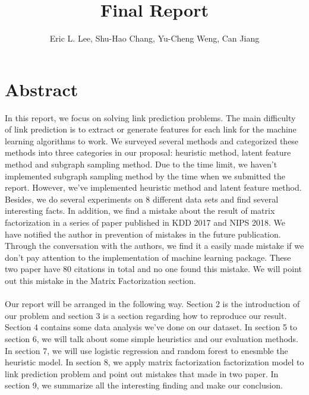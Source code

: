 \documentclass[12pt]{article}
\begin{document}
 
\title{Final Report}
\author{Eric L. Lee, Shu-Hao Chang, Yu-Cheng Weng, Can Jiang} 
\maketitle

\section{Abstract}

In this report, we focus on solving link prediction problems. The main difficulty of link prediction is to extract or generate features for each link for the machine learning algorithms to work. We surveyed several methods and categorized these methods into three categories in our proposal: heuristic method, latent feature method and subgraph sampling method.
Due to the time limit, we haven't implemented subgraph sampling method by the time when we submitted the report. However, we've implemented heuristic method and latent feature method. Besides, we do several experiments on 8 different data sets and find several interesting facts. In addition, we find a mistake about the result of matrix factorization in a series of paper published in KDD 2017 and NIPS 2018. We have notified the author in prevention of mistakes in the future publication. Through the conversation with the authors, we find it a easily made mistake if we don't pay attention to the implementation of machine learning package. These two paper have 80 citations in total and no one found this mistake. We will point out this mistake in the Matrix Factorization section.
\\ \\
Our report will be arranged in the following way. Section 2 is the introduction of our problem and section 3 is a section regarding how to reproduce our result. Section 4 contains some data analysis we've done on our dataset. In section 5 to section 6, we will talk about some simple heuristics and our evaluation methods. In section 7, we will use logistic regression and random forest to enesmble the heuristic model. In section 8, we apply matrix factorization factorization model to link prediction problem and point out mistakes that made in two paper. In section 9, we summarize all the interesting finding and make our conclusion.
\end{document}
